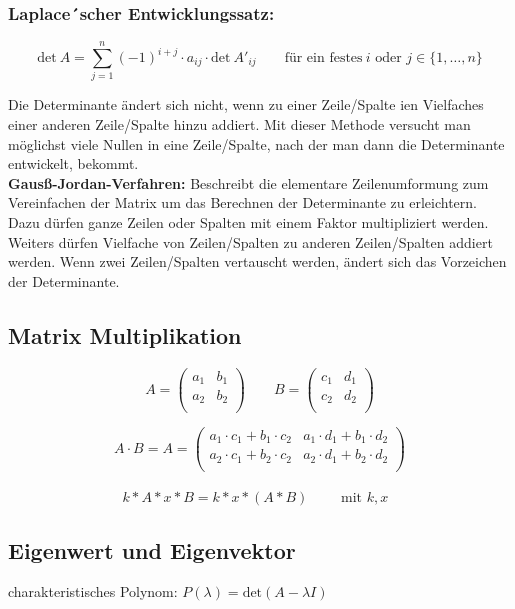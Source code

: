 \subsubsection{Laplace´scher Entwicklungssatz:}

\[
\text{det}\ A=\sum\limits_{j=1}^{n}(-1)^{i+j}\cdot a_{ij}\cdot \text{det}\ A'_{ij}\qquad \text{für ein festes}\ i\text{ oder } j \in \{1,\ldots,n \}
\]

Die Determinante ändert sich nicht, wenn zu einer Zeile/Spalte ien Vielfaches einer anderen Zeile/Spalte hinzu addiert. Mit dieser Methode versucht man möglichst viele Nullen in eine Zeile/Spalte, nach der man dann die Determinante entwickelt, bekommt.\\

\textbf{Gausß-Jordan-Verfahren:} Beschreibt die elementare Zeilenumformung zum Vereinfachen der Matrix um das Berechnen der Determinante zu erleichtern. Dazu dürfen ganze Zeilen oder Spalten mit einem Faktor multipliziert werden. Weiters dürfen Vielfache von Zeilen/Spalten zu anderen Zeilen/Spalten addiert werden. Wenn zwei Zeilen/Spalten vertauscht werden, ändert sich das Vorzeichen der Determinante.

\subsection{Matrix Multiplikation}

\[A=\begin{pmatrix}
 a_1 & b_1 \\
 a_2 & b_2 \\
\end{pmatrix} \qquad
B=\begin{pmatrix}
 c_1 & d_1 \\
 c_2 & d_2 \\
\end{pmatrix}\]

\[A\cdot B = 
A=\begin{pmatrix}
 a_1 \cdot c_1 + b_1 \cdot c_2 & a_1 \cdot d_1 + b_1 \cdot d_2 \\
 a_2 \cdot c_1 + b_2 \cdot c_2 & a_2 \cdot d_1 + b_2 \cdot d_2 \\
\end{pmatrix}\]\\

\[
    k*A*x*B = k*x*(A*B) \qquad \text{ mit } k,x \text{ }
\]

\subsection{Eigenwert und Eigenvektor}
charakteristisches Polynom: $P(\lambda)=\text{det}(A-\lambda I)$\\

